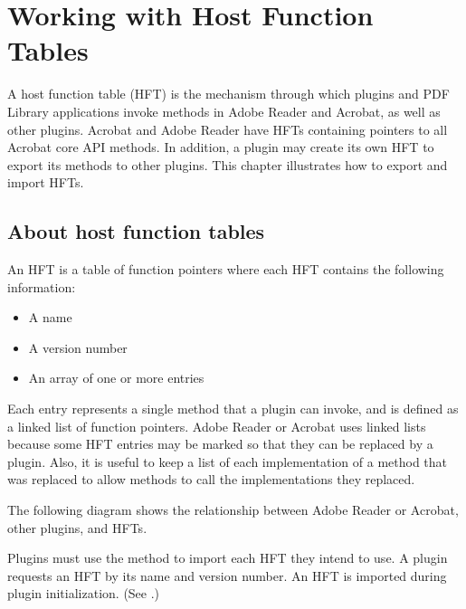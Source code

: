\documentclass[letterpaper,12pt,english,openany,oneside]{sphinxmanual}
\begin{document}
\chapter{Working with Host Function Tables}
\label{\detokenize{Plugins_Hft:working-with-host-function-tables}}\label{\detokenize{Plugins_Hft::doc}}
A host function table (HFT) is the mechanism through which plugins and PDF Library applications invoke methods in Adobe Reader and Acrobat, as well as other plugins. Acrobat and Adobe Reader have HFTs containing pointers to all Acrobat core API methods. In addition, a plugin may create its own HFT to export its methods to other plugins. This chapter illustrates how to export and import HFTs.


\section{About host function tables}
\label{\detokenize{Plugins_Hft:about-host-function-tables}}
An HFT is a table of function pointers where each HFT contains the following information:
\begin{itemize}
\item {} 
A name

\item {} 
A version number

\item {} 
An array of one or more entries

\end{itemize}

Each entry represents a single method that a plugin can invoke, and is defined as a linked list of function pointers. Adobe Reader or Acrobat uses linked lists because some HFT entries may be marked so that they can be replaced by a plugin. Also, it is useful to keep a list of each implementation of a method that was replaced to allow methods to call the implementations they replaced.

The following diagram shows the relationship between Adobe Reader or Acrobat, other plugins, and HFTs.

\noindent{}

Plugins must use the  method to import each HFT they intend to use. A plugin requests an HFT by its name and version number. An HFT is imported during plugin initialization. (See .)
\end{document}
